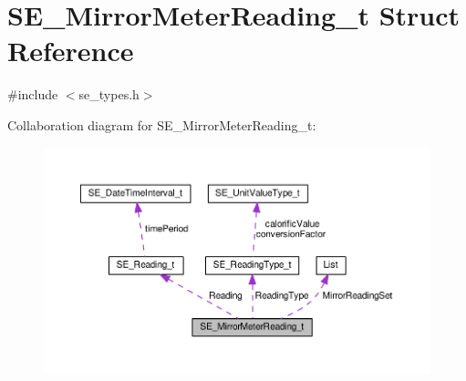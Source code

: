 \hypertarget{structSE__MirrorMeterReading__t}{}\section{S\+E\+\_\+\+Mirror\+Meter\+Reading\+\_\+t Struct Reference}
\label{structSE__MirrorMeterReading__t}


{\ttfamily \#include $<$se\+\_\+types.\+h$>$}



Collaboration diagram for S\+E\+\_\+\+Mirror\+Meter\+Reading\+\_\+t\+:\nopagebreak
\begin{figure}[H]
\begin{center}
\leavevmode
\includegraphics[width=350pt]{structSE__MirrorMeterReading__t__coll__graph}
\end{center}
\end{figure}
